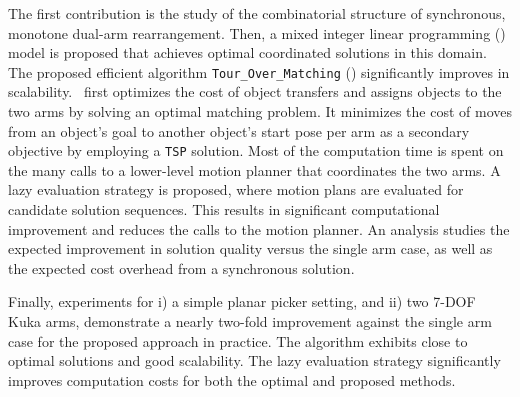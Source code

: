 The first contribution is the study of the combinatorial structure of
synchronous, monotone dual-arm rearrangement. Then, a mixed integer linear programming (\milp) model is
proposed that achieves optimal coordinated solutions in this domain.
The proposed efficient algorithm {\tt Tour\_Over\_Matching} (\algo) significantly improves in scalability. \algo\ first optimizes the
cost of object transfers and assigns objects to the two arms by
solving an optimal matching problem. It minimizes the cost of
moves from an object's goal to another object's start pose per
arm as a secondary objective by employing a {\tt TSP} solution. Most
of the computation time is spent on the many calls to a
lower-level motion planner that coordinates the two arms. A lazy
evaluation strategy is proposed, where motion plans are evaluated for candidate solution sequences. This results in significant computational improvement and
reduces the calls to the motion planner.  An analysis
studies the expected improvement in solution quality
versus the single arm case, as well as the expected cost overhead from a
synchronous solution.

Finally, experiments for i) a simple planar picker setting, and ii) two 7-DOF Kuka arms, demonstrate a nearly two-fold
improvement against the single arm case for the proposed approach in practice. The algorithm exhibits close to optimal solutions and good scalability. 
The lazy evaluation strategy significantly improves computation costs for both the optimal and proposed methods.


